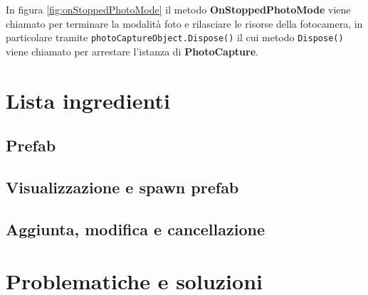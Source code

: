 In figura \ref{fig:onStoppedPhotoMode} il metodo \textbf{OnStoppedPhotoMode} viene chiamato per terminare la modalità foto e rilasciare le risorse della fotocamera, in particolare tramite \texttt{photoCaptureObject.Dispose()} il cui metodo \texttt{Dispose()} viene chiamato per arrestare l'istanza di \textbf{PhotoCapture}.

\section{Lista ingredienti}
\subsection{Prefab}
\subsection{Visualizzazione e spawn prefab}
\subsection{Aggiunta, modifica e cancellazione}


\section{Problematiche e soluzioni} 
